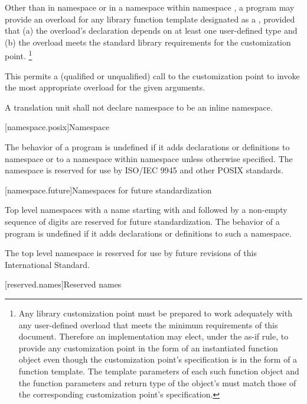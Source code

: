 \pnum
Other than in namespace 
or in a namespace
within namespace ,
a program may provide
an overload for any library function template
designated as a ,
provided that
(a)
the overload's declaration depends
on at least one user-defined type
and
(b)
the overload meets the standard library requirements
for the customization point.%
\footnote{
Any library customization point
must be prepared
to work adequately
with any user-defined overload
that meets the minimum requirements
of this document.
Therefore
an implementation may elect,
under the as-if rule,
to provide any customization point
in the form
of an instantiated function object
even though the customization point's specification
is in the form
of a function template.
The template parameters
of each such function object
and the function parameters
and return type
of the object's 
must match those
of the corresponding customization point's specification.}
\begin{note}
This permits
a (qualified or unqualified) call
to the customization point
to invoke the most appropriate overload
for the given arguments.
\end{note}

\pnum
A translation unit shall not declare namespace  to be an inline namespace.

[namespace.posix]{Namespace }

\pnum
The behavior of a \Cpp{} program is undefined if it adds declarations or definitions to namespace
or to a namespace within namespace
unless otherwise specified. The namespace  is reserved for use by
ISO/IEC 9945 and other POSIX standards.

[namespace.future]{Namespaces for future standardization}

\pnum
Top level namespaces with a name starting with  and
followed by a non-empty sequence of digits
are reserved for future standardization.
The behavior of a \Cpp{} program is undefined if
it adds declarations or definitions to such a namespace.
\begin{example} The top level namespace  is reserved
for use by future revisions of this International Standard. \end{example}

[reserved.names]{Reserved names}%


